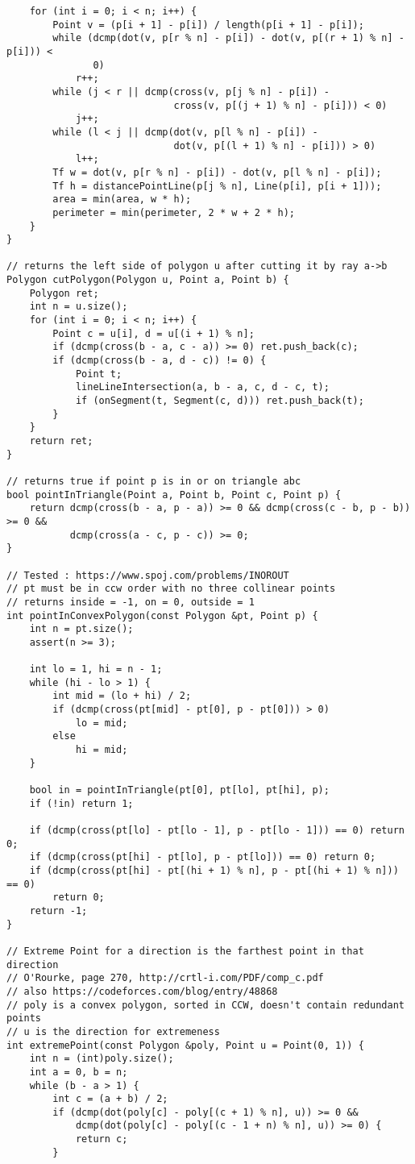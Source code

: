 \documentclass[10pt,a4paper,onesided]{article}
\begin{document}
\begin{multicols*}{3}
\begin{lstlisting}
    for (int i = 0; i < n; i++) {
        Point v = (p[i + 1] - p[i]) / length(p[i + 1] - p[i]);
        while (dcmp(dot(v, p[r % n] - p[i]) - dot(v, p[(r + 1) % n] - p[i])) <
               0)
            r++;
        while (j < r || dcmp(cross(v, p[j % n] - p[i]) -
                             cross(v, p[(j + 1) % n] - p[i])) < 0)
            j++;
        while (l < j || dcmp(dot(v, p[l % n] - p[i]) -
                             dot(v, p[(l + 1) % n] - p[i])) > 0)
            l++;
        Tf w = dot(v, p[r % n] - p[i]) - dot(v, p[l % n] - p[i]);
        Tf h = distancePointLine(p[j % n], Line(p[i], p[i + 1]));
        area = min(area, w * h);
        perimeter = min(perimeter, 2 * w + 2 * h);
    }
}

// returns the left side of polygon u after cutting it by ray a->b
Polygon cutPolygon(Polygon u, Point a, Point b) {
    Polygon ret;
    int n = u.size();
    for (int i = 0; i < n; i++) {
        Point c = u[i], d = u[(i + 1) % n];
        if (dcmp(cross(b - a, c - a)) >= 0) ret.push_back(c);
        if (dcmp(cross(b - a, d - c)) != 0) {
            Point t;
            lineLineIntersection(a, b - a, c, d - c, t);
            if (onSegment(t, Segment(c, d))) ret.push_back(t);
        }
    }
    return ret;
}

// returns true if point p is in or on triangle abc
bool pointInTriangle(Point a, Point b, Point c, Point p) {
    return dcmp(cross(b - a, p - a)) >= 0 && dcmp(cross(c - b, p - b)) >= 0 &&
           dcmp(cross(a - c, p - c)) >= 0;
}

// Tested : https://www.spoj.com/problems/INOROUT
// pt must be in ccw order with no three collinear points
// returns inside = -1, on = 0, outside = 1
int pointInConvexPolygon(const Polygon &pt, Point p) {
    int n = pt.size();
    assert(n >= 3);

    int lo = 1, hi = n - 1;
    while (hi - lo > 1) {
        int mid = (lo + hi) / 2;
        if (dcmp(cross(pt[mid] - pt[0], p - pt[0])) > 0)
            lo = mid;
        else
            hi = mid;
    }

    bool in = pointInTriangle(pt[0], pt[lo], pt[hi], p);
    if (!in) return 1;

    if (dcmp(cross(pt[lo] - pt[lo - 1], p - pt[lo - 1])) == 0) return 0;
    if (dcmp(cross(pt[hi] - pt[lo], p - pt[lo])) == 0) return 0;
    if (dcmp(cross(pt[hi] - pt[(hi + 1) % n], p - pt[(hi + 1) % n])) == 0)
        return 0;
    return -1;
}

// Extreme Point for a direction is the farthest point in that direction
// O'Rourke, page 270, http://crtl-i.com/PDF/comp_c.pdf
// also https://codeforces.com/blog/entry/48868
// poly is a convex polygon, sorted in CCW, doesn't contain redundant points
// u is the direction for extremeness
int extremePoint(const Polygon &poly, Point u = Point(0, 1)) {
    int n = (int)poly.size();
    int a = 0, b = n;
    while (b - a > 1) {
        int c = (a + b) / 2;
        if (dcmp(dot(poly[c] - poly[(c + 1) % n], u)) >= 0 &&
            dcmp(dot(poly[c] - poly[(c - 1 + n) % n], u)) >= 0) {
            return c;
        }


\end{lstlisting}
\end{multicols*}
\end{document}
